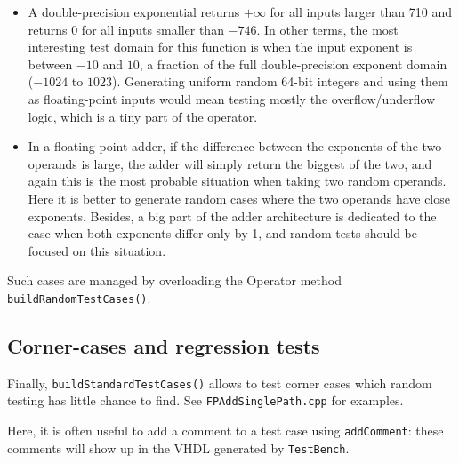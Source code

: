 \documentclass{article}
\begin{document}
\begin{itemize}\item 
  A double-precision exponential returns $+\infty$ for all inputs
  larger than 710 and returns $0$ for all inputs smaller than
  $-746$. In other terms, the most interesting test domain for this
  function is when the input exponent is between $-10$ and $10$, a
  fraction of the full double-precision exponent domain ($-1024$ to
  $1023$). Generating uniform random 64-bit integers and using them as
  floating-point inputs would mean testing mostly the
  overflow/underflow logic, which is a tiny part of the operator.


\item In a floating-point adder, if the difference between the
  exponents of the two operands is large, the adder will simply return
  the biggest of the two, and again this is the most probable
  situation when taking two random operands. Here it is better to
  generate random cases where the two operands have close
  exponents. Besides, a big part of the adder architecture is
  dedicated to the case when both exponents differ only by 1, and
  random tests should be focused on this situation.
\end{itemize}
  Such cases are managed by overloading the Operator method
  \texttt{\small buildRandomTestCases()}. 

\subsection{Corner-cases and regression tests}
Finally, \texttt{\small buildStandardTestCases()} allows to test
corner cases which random testing has little chance to find. See
\texttt{\small FPAddSinglePath.cpp} for examples. 

Here, it is often useful to add
a comment to a test case using \texttt{\small addComment}: these comments
will show up in the VHDL generated by \texttt{\small TestBench}.
\end{document}
